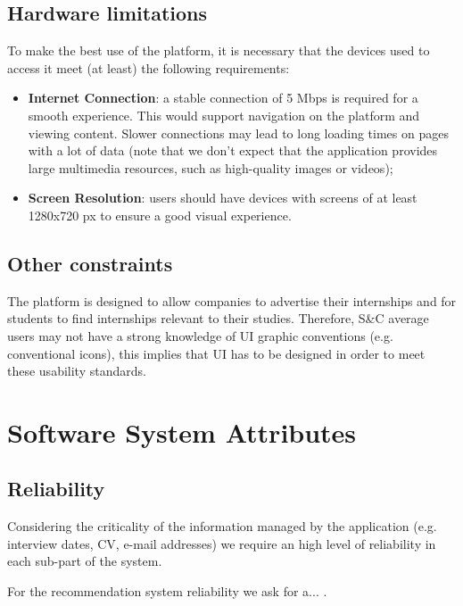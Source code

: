 		\subsection{Hardware limitations}
		
			To make the best use of the platform, it is necessary that the devices used to access it meet (at least) the following requirements:
			
			\begin{itemize}
				\item\textbf{Internet Connection}: a stable connection of 5 Mbps is required for a smooth experience. This would support navigation on the platform and viewing content. Slower connections may lead to long loading times on pages with a lot of data (note that we don't expect that the application provides large multimedia resources, such as high-quality images or videos);
				\item \textbf{Screen Resolution}: users should have devices with screens of at least 1280x720 px to ensure a good visual experience.
			\end{itemize}
			
		\subsection{Other constraints}
			The platform is designed to allow companies to advertise their internships and for students to find internships relevant to their studies. Therefore, S\&C average users may not have a strong knowledge of UI graphic conventions (e.g. conventional icons), this implies that UI has to be designed in order to meet these usability standards.
	\section{Software System Attributes}
		\subsection{Reliability}
			Considering the criticality of the information managed by the application (e.g. interview dates, CV, e-mail addresses) we require an high level of reliability in each sub-part of the system.
			
			For the recommendation system reliability we ask for a... .
